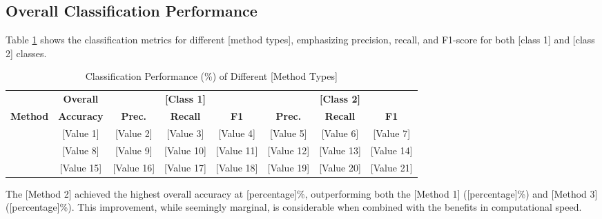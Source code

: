 
\subsection{Overall Classification Performance}

Table \ref{tab:classification_performance} shows the classification metrics for different [method types], emphasizing precision, recall, and F1-score for both [class 1] and [class 2] classes.

\begin{table}[htbp]
\caption{Classification Performance (\%) of Different [Method Types]}
\label{tab:classification_performance}
\begin{tabular}{|l|c|c|c|c|c|c|c|}
\hline
& \textbf{Overall} & \multicolumn{3}{c|}{\textbf{[Class 1]}} & \multicolumn{3}{c|}{\textbf{[Class 2]}} \\
\cline{3-8}
\textbf{Method} & \textbf{Accuracy} & \textbf{Prec.} & \textbf{Recall} & \textbf{F1} & \textbf{Prec.} & \textbf{Recall} & \textbf{F1} \\
\hline
[Method 2] & [Value 1] & [Value 2] & [Value 3] & [Value 4] & [Value 5] & [Value 6] & [Value 7] \\
\hline
[Method 1] & [Value 8] & [Value 9] & [Value 10] & [Value 11] & [Value 12] & [Value 13] & [Value 14] \\
\hline
[Method 3] & [Value 15] & [Value 16] & [Value 17] & [Value 18] & [Value 19] & [Value 20] & [Value 21] \\
\hline
\end{tabular}
\end{table}

The [Method 2] achieved the highest overall accuracy at [percentage]\%, outperforming both the [Method 1] ([percentage]\%) and [Method 3] ([percentage]\%). This improvement, while seemingly marginal, is considerable when combined with the benefits in computational speed.

